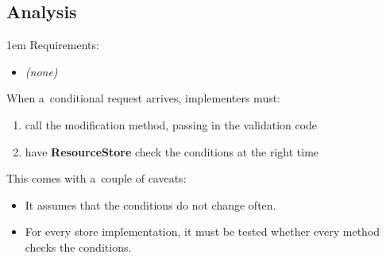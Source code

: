 \documentclass[10pt]{article}
\newenvironment{Note}
  {\begin{multicols}{3}%
     \parskip 1em}
  {\end{multicols}}
\begin{document}
\subsection*{Analysis}

\begin{Note}
Requirements:
\begin{itemize}
  \item \emph{(none)}
\end{itemize}



\bigskip
When a~conditional request arrives, implementers must:
\begin{enumerate}
  \item call the modification method,
        passing in the validation code
  \item have \textbf{ResourceStore} check the conditions
        at the right time
\end{enumerate}

\bigskip
This comes with a~couple of caveats:
\begin{itemize}
  \item It assumes that the conditions do not change often.
  \item For every store implementation,
        it must be tested whether every method checks the conditions.
\end{itemize}

\columnbreak
\null


\columnbreak
\null

\end{Note}
\end{document}
